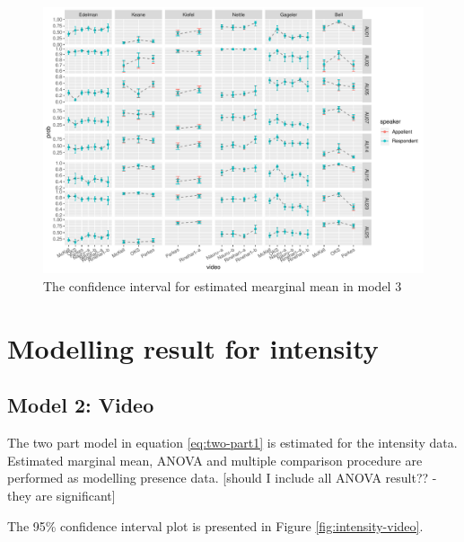 \documentclass{monashthesis}
\begin{document}
\begin{figure}

{\centering \includegraphics[width=1\linewidth]{figures/model3-plot-1} 

}

\caption{The confidence interval for estimated mearginal mean in model 3}\label{fig:model3-plot}
\end{figure}

\newpage

\hypertarget{modelling-result-for-intensity}{%
\section{Modelling result for intensity}\label{modelling-result-for-intensity}}

\hypertarget{model-2-video-2}{%
\subsection{Model 2: Video}\label{model-2-video-2}}

The two part model in equation \ref{eq:two-part1} is estimated for the intensity data. Estimated marginal mean, ANOVA and multiple comparison procedure are performed as modelling presence data. {[}should I include all ANOVA result?? - they are significant{]}

The 95\% confidence interval plot is presented in Figure \ref{fig:intensity-video}.
\end{document}
